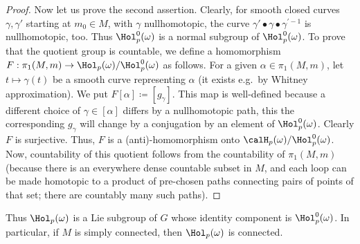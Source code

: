 \begin{proof}
    Now let us prove the second assertion. Clearly, for smooth closed curves $\gamma,\gamma'$ starting at $m_0\in M$, with $\gamma$ nullhomotopic, the curve $\gamma'\bullet\gamma\bullet\gamma^{\prime-1}$ is nullhomotopic, too. Thus $\Hol_p^0(\omega)$ is a normal subgroup of $\Hol_p^0(\omega)$. To prove that the quotient group is countable, we define a homomorphism $F:\pi_1(M,m)\to \Hol_p(\omega)\slash\Hol_p^0(\omega)$ as follows. For a given $\alpha\in\pi_1(M,m)$, let $t\mapsto \gamma(t)$ be a smooth curve representing $\alpha$ (it exists e.g.\ by Whitney approximation). We put $F[\alpha]\coloneqq [g_{\gamma}]$. This map is well-defined because a different choice of $\gamma\in [\alpha]$ differs by a nullhomotopic path, this the corresponding $g_\gamma$ will change by a conjugation by an element of $\Hol^0_p(\omega)$. Clearly $F$ is surjective. Thus, $F$ is a (anti)-homomorphism onto $\calH_p(\omega)\slash \Hol^0_p(\omega)$. Now, countability of this quotient follows from the countability of $\pi_1(M,m)$ (because there is an everywhere dense countable subset in $M$, and each loop can be made homotopic to a product of pre-chosen paths connecting pairs of points of that set; there are countably many such paths).
\end{proof}


\begin{rem}
    Thus $\Hol_p(\omega)$ is a Lie subgroup of $G$ whose identity component is $\Hol_p^0(\omega)$. In particular, if $M$ is simply connected, then $\Hol_p(\omega)$ is connected.
\end{rem}

